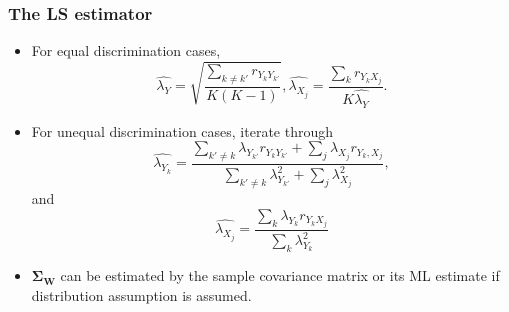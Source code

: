 \documentclass{beamer}
\newcommand{\mbf}[1]{\bm{#1}}
\newcommand{\bW}{\mbf{W}}
\newcommand{\bsigma}{\mbf{\Sigma}}
\begin{document}
	\begin{frame}[t]\frametitle{The LS estimator}
		\begin{itemize}
			\item For equal discrimination cases,
			\begin{equation}
		    \hat{\lambda_Y} = \sqrt{\frac{\sum_{k \neq k'} r_{Y_k Y_{k'}}}{K(K-1)}},
		    \hat{\lambda_{X_j}} = \frac{\sum_k r_{Y_k X_j}}{K\hat{\lambda_Y}}.
		  \end{equation}
		  \item For unequal discrimination cases, iterate through
		  \begin{equation}
		    \hat{\lambda_{Y_k}} = \frac{\sum_{k' \neq k} \lambda_{Y_{k'}} r_{Y_{k}Y_
		    {k'}} + \sum_j \lambda_{X_j} r_{Y_k, X_j}}{\sum_{k' \neq k} \lambda_{Y_
		    {k'}}^2 + \sum_j \lambda_{X_j}^2},
		  \end{equation}
		  and
		  \begin{equation}
		    \hat{\lambda_{X_j}} = \frac{\sum_k \lambda_{Y_k} r_{Y_k X_j}}{\sum_k
		    \lambda_{Y_k}^2}
		  \end{equation}
		 	\item $\bsigma_{\bW}$ can be estimated by the sample covariance matrix or its
		 	ML estimate if distribution assumption is assumed.
		\end{itemize}
	\end{frame}
\end{document}
